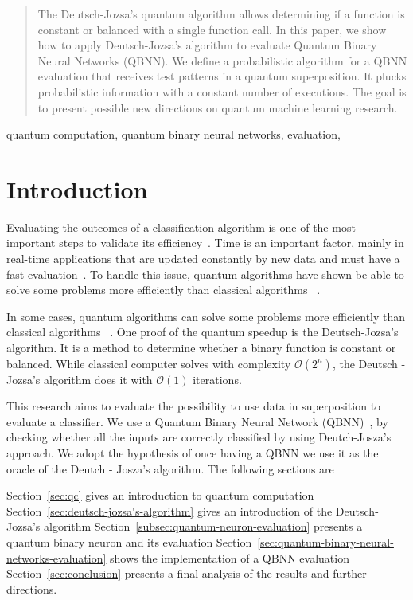 \documentclass[conference]{IEEEtran}
\begin{document}
\begin{abstract}
The Deutsch-Jozsa's quantum algorithm allows determining if a function is constant or balanced with a single function call.
In this paper, we show how to apply Deutsch-Jozsa's algorithm to evaluate Quantum Binary Neural Networks (QBNN).
We define a probabilistic algorithm for a QBNN evaluation that receives test patterns in a quantum superposition.
It plucks probabilistic information with a constant number of executions.
The goal is to present possible new directions on quantum machine learning research.
\end{abstract}

\begin{IEEEkeywords}
quantum computation, quantum binary neural networks, evaluation,
\end{IEEEkeywords}

\section{Introduction}\label{sec:introduction}
Evaluating the outcomes of a classification algorithm is one of the most important steps to validate its
efficiency~\cite{japkowicz2006question}.
Time is an important factor, mainly in
real-time applications that are updated constantly by new data and must have a fast evaluation~\cite{chen2012classifier}.
To handle this issue, quantum algorithms have shown be able to solve some problems more efficiently than classical algorithms
~\cite{deutsch1992rapid}.

In some cases, quantum algorithms can solve some problems more efficiently than classical algorithms
~\cite{deutsch1992rapid}.
One proof of the quantum speedup is the Deutsch-Jozsa's algorithm.
It is a method to determine whether a binary function is constant or balanced.
While classical computer solves with complexity \(\mathcal{O}(2^{n})\),
the Deutsch - Jozsa's algorithm does it with \(\mathcal{O}(1)\) iterations.

This research aims to evaluate the possibility to use data in superposition to evaluate a classifier.
We use a Quantum Binary Neural Network (QBNN)~\cite{fawaz2019training}, by checking whether all the inputs are correctly
classified by using Deutch-Josza's approach.
We adopt the hypothesis of once having a QBNN we use it as the oracle of the Deutch - Josza's algorithm.
The following sections are

Section~\ref{sec:qc} gives an introduction to quantum computation
Section~\ref{sec:deutsch-jozsa's-algorithm} gives an introduction of the Deutsch-Jozsa's algorithm
Section~\ref{subsec:quantum-neuron-evaluation} presents a quantum binary neuron and its evaluation
Section~\ref{sec:quantum-binary-neural-networks-evaluation} shows the implementation of a QBNN evaluation
Section~\ref{sec:conclusion} presents a final analysis of the results and further directions.
\end{document}

